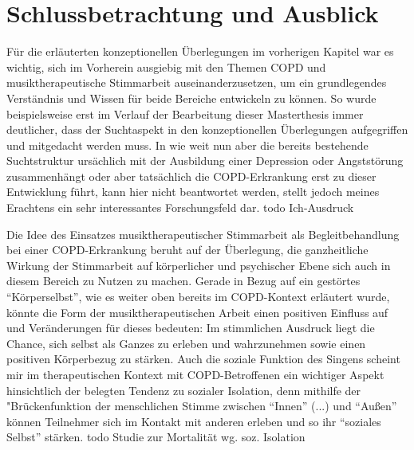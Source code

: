 \chapter{Schlussbetrachtung und Ausblick} %
Für die erläuterten konzeptionellen Überlegungen im vorherigen Kapitel war es wichtig, sich im Vorherein ausgiebig mit den Themen COPD und musiktherapeutische Stimmarbeit auseinanderzusetzen, um ein grundlegendes Verständnis und Wissen für beide Bereiche entwickeln zu können. So wurde beispielsweise erst im Verlauf der Bearbeitung dieser Masterthesis immer deutlicher, dass der Suchtaspekt in den konzeptionellen Überlegungen aufgegriffen und mitgedacht werden muss. In wie weit nun aber die bereits bestehende Suchtstruktur ursächlich mit der Ausbildung einer Depression oder Angststörung zusammenhängt oder aber tatsächlich die COPD-Erkrankung erst zu dieser Entwicklung führt, kann hier nicht beantwortet werden, stellt jedoch meines Erachtens ein sehr interessantes Forschungsfeld dar. todo Ich-Ausdruck

Die Idee des Einsatzes musiktherapeutischer Stimmarbeit als Begleitbehandlung bei einer COPD-Erkrankung beruht auf der Überlegung, die ganzheitliche Wirkung der Stimmarbeit auf körperlicher und psychischer Ebene sich auch in diesem Bereich zu Nutzen zu machen. Gerade in Bezug auf ein gestörtes "`Körperselbst"', wie es weiter oben bereits im COPD-Kontext erläutert wurde, könnte die Form der musiktherapeutischen Arbeit einen positiven Einfluss auf und Veränderungen für dieses bedeuten: Im stimmlichen Ausdruck liegt die Chance, sich selbst als Ganzes zu erleben und wahrzunehmen sowie einen positiven Körperbezug zu stärken. Auch die soziale Funktion des Singens scheint mir im therapeutischen Kontext mit COPD-Betroffenen ein wichtiger Aspekt hinsichtlich der belegten Tendenz zu sozialer Isolation, denn mithilfe der "Brückenfunktion der menschlichen Stimme zwischen "`Innen"' (...) und "`Außen"' können Teilnehmer sich im Kontakt mit anderen erleben und so ihr "`soziales Selbst"' stärken. todo Studie zur Mortalität wg. soz. Isolation






